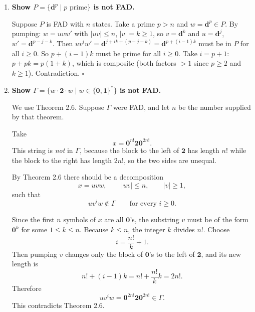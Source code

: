 \begin{enumerate}[{2.}1.]
Take
\[
x=\mathbf{a}^n\mathbf{b}^{n+1}.
\]
Then $x\notin G$, because $|x|_\mathbf{a}=n$ and $|x|_\mathbf{b}=n+1$.

By Theorem 2.6 there should be a decomposition
\[
x=uvw,\qquad |uv|\le n,\qquad |v|\ge1,
\]
such that
\[
uv^iw\notin G\qquad\text{for every }i\ge0.
\]

Since the first $n$ symbols of $x$ are all $\mathbf{a}$'s, the substring $v$
must be of the form $\mathbf{a}^k$ for some $k\ge1$.
Now pump once more than usual, taking $i=2$. Then
\[
uv^2w=\mathbf{a}^{n+k}\mathbf{b}^{n+1}.
\]
Because $k\ge1$, we have $n+k\ge n+1$, so
\[
|uv^2w|_\mathbf{a}\ge |uv^2w|_\mathbf{b}.
\]
Hence $uv^2w\in G$, contradicting Theorem 2.6.

Therefore $G$ is not FAD. $\square$

\item \textbf{Show $P=\{\mathbf{d}^p\mid p\text{ prime}\}$ is not FAD.}

Suppose $P$ is FAD with $n$ states. Take a prime $p>n$ and $w=\mathbf{d}^p\in P$. By pumping: $w=uvw'$ with $|uv|\leq n$, $|v|=k\geq 1$, so $v=\mathbf{d}^k$ and $u=\mathbf{d}^j$, $w'=\mathbf{d}^{p-j-k}$. Then $uv^iw'=\mathbf{d}^{j+ik+(p-j-k)}=\mathbf{d}^{p+(i-1)k}$ must be in $P$ for all $i\geq 0$. So $p+(i-1)k$ must be prime for all $i\geq 0$. Take $i=p+1$: $p+pk=p(1+k)$, which is composite (both factors $>1$ since $p\geq 2$ and $k\geq 1$). Contradiction. $\square$

\item \textbf{Show $\Gamma=\{w\cdot\mathbf{2}\cdot w\mid w\in\{\mathbf{0},\mathbf{1}\}^*\}$ is not FAD.}

We use Theorem 2.6. Suppose $\Gamma$ were FAD, and let $n$ be the number
supplied by that theorem.

Take
\[
x=\mathbf{0}^{ n!}\mathbf{2}\mathbf{0}^{ 2n!}.
\]
This string is \emph{not} in $\Gamma$, because the block to the left of
$\mathbf{2}$ has length $n!$ while the block to the right has length $2n!$, so
the two sides are unequal.

By Theorem 2.6 there should be a decomposition
\[
x=uvw,\qquad |uv|\le n,\qquad |v|\ge1,
\]
such that
\[
uv^iw\notin\Gamma\qquad\text{for every }i\ge0.
\]

Since the first $n$ symbols of $x$ are all $\mathbf{0}$'s, the substring $v$
must be of the form $\mathbf{0}^k$ for some $1\le k\le n$.
Because $k\le n$, the integer $k$ divides $n!$.
Choose
\[
i=\frac{n!}{k}+1.
\]
Then pumping $v$ changes only the block of $\mathbf{0}$'s to the left of
$\mathbf{2}$, and its new length is
\[
n!+(i-1)k=n!+\frac{n!}{k}k=2n!.
\]
Therefore
\[
uv^iw=\mathbf{0}^{ 2n!}\mathbf{2}\mathbf{0}^{ 2n!}\in\Gamma.
\]
This contradicts Theorem 2.6.


\end{enumerate}
